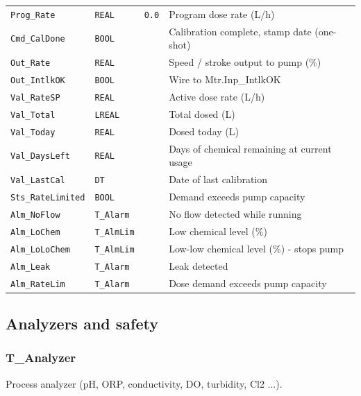 {\begin{longtable}{@{}>{\raggedright\arraybackslash}p{3.4cm}>{\raggedright\arraybackslash}p{3.3cm}>{\raggedright\arraybackslash}p{1.3cm}>{\raggedright\arraybackslash}p{6.4cm}@{}}
\texttt{Prog\_Rate} & \texttt{REAL} & \texttt{0.0} & Program dose rate (L/\allowbreak{}h) \\
\texttt{Cmd\_CalDone} & \texttt{BOOL} &  & Calibration complete, stamp date (one-shot) \\
\texttt{Out\_Rate} & \texttt{REAL} &  & Speed /\allowbreak{} stroke output to pump (\%) \\
\texttt{Out\_IntlkOK} & \texttt{BOOL} &  & Wire to Mtr.Inp\_IntlkOK \\
\texttt{Val\_RateSP} & \texttt{REAL} &  & Active dose rate (L/\allowbreak{}h) \\
\texttt{Val\_Total} & \texttt{LREAL} &  & Total dosed (L) \\
\texttt{Val\_Today} & \texttt{REAL} &  & Dosed today (L) \\
\texttt{Val\_DaysLeft} & \texttt{REAL} &  & Days of chemical remaining at current usage \\
\texttt{Val\_LastCal} & \texttt{DT} &  & Date of last calibration \\
\texttt{Sts\_RateLimited} & \texttt{BOOL} &  & Demand exceeds pump capacity \\
\texttt{Alm\_NoFlow} & \texttt{T\_Alarm} &  & No flow detected while running \\
\texttt{Alm\_LoChem} & \texttt{T\_AlmLim} &  & Low chemical level (\%) \\
\texttt{Alm\_LoLoChem} & \texttt{T\_AlmLim} &  & Low-low chemical level (\%) - stops pump \\
\texttt{Alm\_Leak} & \texttt{T\_Alarm} &  & Leak detected \\
\texttt{Alm\_RateLim} & \texttt{T\_Alarm} &  & Dose demand exceeds pump capacity \\
\bottomrule
\end{longtable}
}
\subsection{Analyzers and safety}
\subsubsection*{T\_Analyzer}
\label{app:pclib:tanalyzer}
Process analyzer (pH, ORP, conductivity, DO, turbidity, Cl2 ...).

